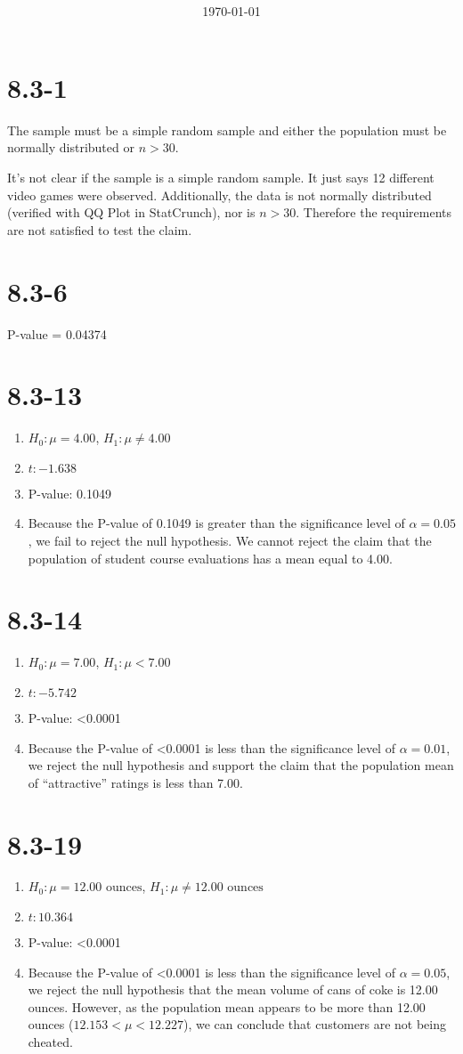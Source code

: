 \documentclass[12pt,fleqn]{article}
\title{\classdescription\ \\ \classname\ \\ $\ $ \\ \assignment}
\author{\authorname}
\date{\today}
\newcommand{\chapter}{8.3}
\newcommand{\problem}[1]{\vspace{5ex}\section*{\chapter-#1}}
\begin{document}
\maketitle


\problem{1}
The sample must be a simple random sample and either the population must be normally distributed or $n > 30$.

It's not clear if the sample is a simple random sample. It just says 12 different video games were observed. Additionally, the data is not normally distributed (verified with QQ Plot in StatCrunch), nor is $n > 30$. Therefore the requirements are not satisfied to test the claim.


\problem{6}
P-value = 0.04374


\problem{13}
\begin{enumerate}[label=\alph*.]
\item $H_0: \mu = 4.00$, $H_1: \mu \ne 4.00$
\item $t: -1.638$
\item P-value: 0.1049
\item Because the P-value of 0.1049 is greater than the significance level of $\alpha = 0.05$, we fail to reject the null hypothesis. We cannot reject the claim that the population of student course evaluations has a mean equal to 4.00.
\end{enumerate}


\problem{14}
\begin{enumerate}[label=\alph*.]
\item $H_0: \mu = 7.00$, $H_1: \mu < 7.00$
\item $t: -5.742$
\item P-value: <0.0001
\item Because the P-value of <0.0001 is less than the significance level of $\alpha = 0.01$, we reject the null hypothesis and support the claim that the population mean of ``attractive'' ratings is less than 7.00.
\end{enumerate}


\problem{19}
\begin{enumerate}[label=\alph*.]
\item $H_0: \mu = 12.00 \text{~ounces}$, $H_1: \mu \ne 12.00 \text{~ounces}$
\item $t: 10.364$
\item P-value: <0.0001
\item Because the P-value of <0.0001 is less than the significance level of $\alpha = 0.05$, we reject the null hypothesis that the mean volume of cans of coke is 12.00 ounces. However, as the population mean appears to be more than 12.00 ounces ($12.153 < \mu < 12.227$), we can conclude that customers are not being cheated.
\end{enumerate}
\end{document}
